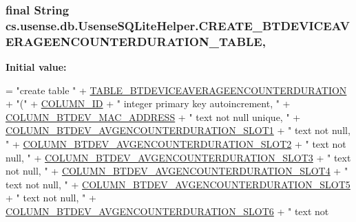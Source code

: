 \subsubsection[{C\+R\+E\+A\+T\+E\+\_\+\+B\+T\+D\+E\+V\+I\+C\+E\+A\+V\+E\+R\+A\+G\+E\+E\+N\+C\+O\+U\+N\+T\+E\+R\+D\+U\+R\+A\+T\+I\+O\+N\+\_\+\+T\+A\+B\+L\+E}]{\setlength{\rightskip}{0pt plus 5cm}final String cs.\+usense.\+db.\+Usense\+S\+Q\+Lite\+Helper.\+C\+R\+E\+A\+T\+E\+\_\+\+B\+T\+D\+E\+V\+I\+C\+E\+A\+V\+E\+R\+A\+G\+E\+E\+N\+C\+O\+U\+N\+T\+E\+R\+D\+U\+R\+A\+T\+I\+O\+N\+\_\+\+T\+A\+B\+L\+E\hspace{0.3cm}{\ttfamily [static]}, {\ttfamily [private]}}\label{classcs_1_1usense_1_1db_1_1_usense_s_q_lite_helper_a17a206855921b838c593e04848078d9d}
{\bfseries Initial value\+:}
\begin{DoxyCode}
= \textcolor{stringliteral}{"create table "}
            + \hyperlink{classcs_1_1usense_1_1db_1_1_usense_s_q_lite_helper_a856b1ec01fbea78f2252e227c0324713}{TABLE\_BTDEVICEAVERAGEENCOUNTERDURATION} + \textcolor{stringliteral}{"("}
            + \hyperlink{classcs_1_1usense_1_1db_1_1_usense_s_q_lite_helper_ac0c4ad3a273f5adda9bdfc60e679379d}{COLUMN\_ID} + \textcolor{stringliteral}{" integer primary key autoincrement, "}
            + \hyperlink{classcs_1_1usense_1_1db_1_1_usense_s_q_lite_helper_a88746e54f676544fb8a10c6e2fd5843b}{COLUMN\_BTDEV\_MAC\_ADDRESS} + \textcolor{stringliteral}{" text not null unique, "}
            + \hyperlink{classcs_1_1usense_1_1db_1_1_usense_s_q_lite_helper_a4364bf9bf47594b9f0a42057c943b105}{COLUMN\_BTDEV\_AVGENCOUNTERDURATION\_SLOT1} + \textcolor{stringliteral}{" text not
       null, "}
            + \hyperlink{classcs_1_1usense_1_1db_1_1_usense_s_q_lite_helper_a80262668354d8645154ea5a14e04c52f}{COLUMN\_BTDEV\_AVGENCOUNTERDURATION\_SLOT2} + \textcolor{stringliteral}{" text not
       null, "}
            + \hyperlink{classcs_1_1usense_1_1db_1_1_usense_s_q_lite_helper_a04317635a4f9a3bcae28f454557e5121}{COLUMN\_BTDEV\_AVGENCOUNTERDURATION\_SLOT3} + \textcolor{stringliteral}{" text not
       null, "}
            + \hyperlink{classcs_1_1usense_1_1db_1_1_usense_s_q_lite_helper_a62bb3995d5ea401d6f3fa03bc0789690}{COLUMN\_BTDEV\_AVGENCOUNTERDURATION\_SLOT4} + \textcolor{stringliteral}{" text not
       null, "}
            + \hyperlink{classcs_1_1usense_1_1db_1_1_usense_s_q_lite_helper_a1a3fe6f437cdb24f4b11948863edc32f}{COLUMN\_BTDEV\_AVGENCOUNTERDURATION\_SLOT5} + \textcolor{stringliteral}{" text not
       null, "}
            + \hyperlink{classcs_1_1usense_1_1db_1_1_usense_s_q_lite_helper_a7fd44ab8fdf8bd1a2f1e873c264a4745}{COLUMN\_BTDEV\_AVGENCOUNTERDURATION\_SLOT6} + \textcolor{stringliteral}{" text not
}
\end{DoxyCode}
